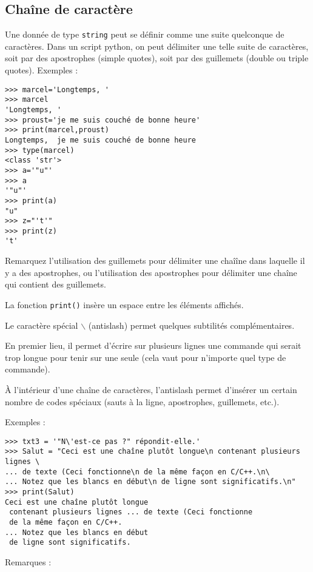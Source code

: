 \subsection{Chaîne de caractère}
Une donnée de type \lstinline?string?  peut se définir  comme une suite quelconque de caractères. Dans un script python, on peut délimiter une telle suite de caractères, soit par des apostrophes (simple quotes), soit par des guillemets (double ou triple quotes). Exemples :
\begin{lstlisting}
>>> marcel='Longtemps, '
>>> marcel
'Longtemps, '
>>> proust='je me suis couché de bonne heure'
>>> print(marcel,proust)
Longtemps,  je me suis couché de bonne heure
>>> type(marcel)
<class 'str'>
>>> a='"u"'
>>> a
'"u"'
>>> print(a)
"u"
>>> z="'t'"
>>> print(z)
't'
\end{lstlisting}
Remarquez l'utilisation des guillemets pour délimiter une chaîîne dans laquelle il y a des apostrophes, ou l'utilisation des apostrophes pour délimiter une chaîne qui contient des guillemets.\par
 La fonction \lstinline?print()? insère un espace entre les éléments affichés.\par
 Le caractère spécial $\backslash$ (antislash) permet quelques subtilités complémentaires.\par 
 En premier lieu, il permet d'écrire sur plusieurs lignes une commande qui serait trop longue pour tenir sur une seule (cela vaut pour n'importe quel type de commande).\par
À l'intérieur d'une chaîne de caractères, l'antislash permet d'insérer un certain nombre de codes spéciaux (sauts à la ligne, apostrophes, guillemets, etc.). \par
Exemples :
\begin{lstlisting}
>>> txt3 = '"N\'est-ce pas ?" répondit-elle.'
>>> Salut = "Ceci est une chaîne plutôt longue\n contenant plusieurs lignes \
... de texte (Ceci fonctionne\n de la même façon en C/C++.\n\
... Notez que les blancs en début\n de ligne sont significatifs.\n"
>>> print(Salut)
Ceci est une chaîne plutôt longue
 contenant plusieurs lignes ... de texte (Ceci fonctionne
 de la même façon en C/C++.
... Notez que les blancs en début
 de ligne sont significatifs.
\end{lstlisting}
 Remarques :
